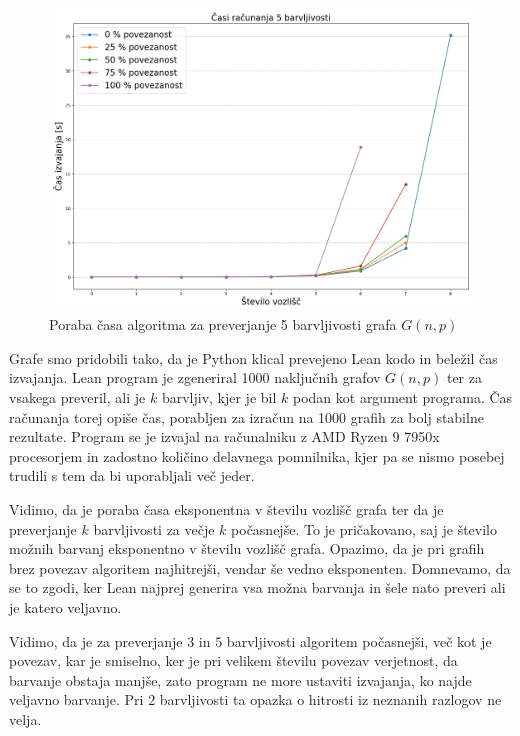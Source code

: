 \documentclass[mat1]{fmfdelo}
\begin{document}
\begin{figure}[H]
\begin{center}
\includegraphics[scale=0.35]{assets/5barvSlow}
\caption{Poraba časa algoritma za preverjanje 5 barvljivosti grafa $G(n, p)$}
\label{slika2}
\end{center}
\end{figure}

Grafe smo pridobili tako, da je Python klical prevejeno Lean kodo in beležil čas izvajanja. Lean program je zgeneriral 1000
naključnih grafov $G(n, p)$ ter za vsakega preveril, ali je $k$ barvljiv, kjer je bil $k$ podan kot argument programa.
Čas računanja torej opiše čas, porabljen za izračun na 1000 grafih za bolj stabilne rezultate. Program se je izvajal
na računalniku z AMD Ryzen 9 7950x procesorjem in zadostno količino delavnega pomnilnika, kjer pa se nismo posebej trudili
s tem da bi uporabljali več jeder. 

Vidimo, da je poraba časa eksponentna v številu vozlišč grafa ter da je preverjanje $k$ barvljivosti za večje $k$ 
počasnejše. To je pričakovano, saj je število možnih barvanj eksponentno v številu vozlišč grafa.
Opazimo, da je pri grafih brez povezav algoritem najhitrejši, vendar še vedno eksponenten. Domnevamo, da se to zgodi, 
ker Lean najprej generira vsa možna barvanja in šele nato preveri ali je katero veljavno. 

Vidimo, da je za preverjanje $3$ in $5$ barvljivosti algoritem počasnejši, več kot je povezav, kar je smiselno, ker je pri velikem 
številu povezav verjetnost, da barvanje obstaja manjše, zato program ne more ustaviti izvajanja, ko najde veljavno barvanje. Pri $2$
barvljivosti ta opazka o hitrosti iz neznanih razlogov ne velja. 
\end{document}
